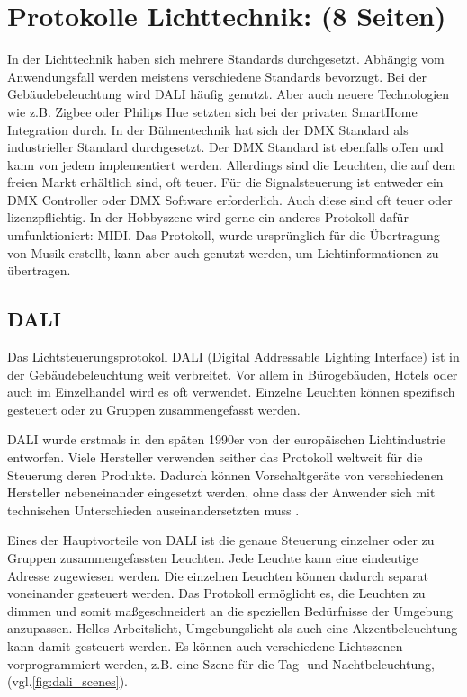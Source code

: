 \chapter{Protokolle Lichttechnik: (8 Seiten)}

In der Lichttechnik haben sich mehrere Standards durchgesetzt. Abhängig vom Anwendungsfall werden meistens verschiedene Standards bevorzugt. Bei der Gebäudebeleuchtung wird DALI häufig genutzt. Aber auch neuere Technologien wie z.B. Zigbee oder Philips Hue setzten sich bei der privaten SmartHome Integration durch. In der Bühnentechnik hat sich der DMX Standard als industrieller Standard durchgesetzt. Der DMX Standard ist ebenfalls offen und kann von jedem implementiert werden. Allerdings sind die Leuchten, die auf dem freien Markt erhältlich sind, oft teuer.  Für die Signalsteuerung ist entweder ein DMX Controller oder DMX Software erforderlich. Auch diese sind oft teuer  oder lizenzpflichtig. In der Hobbyszene wird gerne ein anderes Protokoll dafür umfunktioniert: MIDI. Das Protokoll, wurde ursprünglich für die Übertragung von Musik erstellt, kann aber auch genutzt werden, um Lichtinformationen zu übertragen.


\section{DALI}
Das Lichtsteuerungsprotokoll DALI (Digital Addressable Lighting Interface) ist in der Gebäudebeleuchtung weit verbreitet. Vor allem in Bürogebäuden, Hotels oder auch im Einzelhandel wird es oft verwendet. Einzelne Leuchten können spezifisch gesteuert oder zu Gruppen zusammengefasst werden.

DALI wurde erstmals in den späten 1990er \cite{DALI-2_certification} von der europäischen Lichtindustrie entworfen. Viele Hersteller verwenden seither das Protokoll weltweit für die Steuerung deren Produkte. Dadurch können Vorschaltgeräte von verschiedenen Hersteller nebeneinander eingesetzt werden, ohne dass der Anwender sich mit technischen Unterschieden auseinandersetzten muss \cite[p.2, ch. 3.1]{DALI-Lichtmanagement}.

Eines der Hauptvorteile von DALI ist die genaue Steuerung einzelner oder zu Gruppen zusammengefassten Leuchten. Jede Leuchte kann eine eindeutige Adresse zugewiesen werden. Die einzelnen Leuchten können dadurch separat voneinander gesteuert werden. Das Protokoll ermöglicht es, die Leuchten zu dimmen und somit maßgeschneidert an die speziellen Bedürfnisse der Umgebung anzupassen. Helles Arbeitslicht, Umgebungslicht als auch eine Akzentbeleuchtung kann damit gesteuert werden. Es können auch verschiedene Lichtszenen vorprogrammiert werden, z.B. eine Szene für die Tag- und Nachtbeleuchtung, (vgl.\ref{fig:dali_scenes}).

